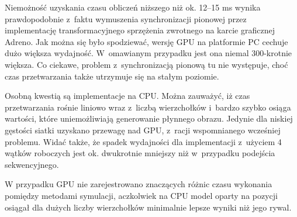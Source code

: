 		Niemożność uzyskania czasu obliczeń niższego niż ok. 12--15 ms wynika prawdopodobnie z~faktu wymuszenia synchronizacji pionowej przez implementację transformacyjnego sprzężenia zwrotnego na karcie graficznej Adreno. Jak można się było spodziewać, wersję GPU na platformie PC cechuje dużo większa wydajność. W~omawianym przypadku jest ona niemal 300-krotnie większa. Co ciekawe, problem z~synchronizacją pionową tu nie występuje, choć czas przetwarzania także utrzymuje się na stałym poziomie. 
		
		Osobną kwestią są implementacje na CPU. Można zauważyć, iż czas przetwarzania rośnie liniowo wraz z~liczbą wierzchołków i~bardzo szybko osiąga wartości, które uniemożliwiają generowanie płynnego obrazu. Jedynie dla niskiej gęstości siatki uzyskano przewagę nad GPU, z~racji wspomnianego wcześniej problemu. Widać także, że spadek wydajności dla implementacji z~użyciem 4 wątków roboczych jest ok. dwukrotnie mniejszy niż w~przypadku podejścia sekwencyjnego.
		
		W przypadku GPU nie zarejestrowano znaczących różnic czasu wykonania pomiędzy metodami symulacji, aczkolwiek na CPU model oparty na pozycji osiągał dla dużych liczby wierzchołków minimalnie lepsze wyniki niż jego rywal.
		
		
		
		
		
		
		
		
		
		
